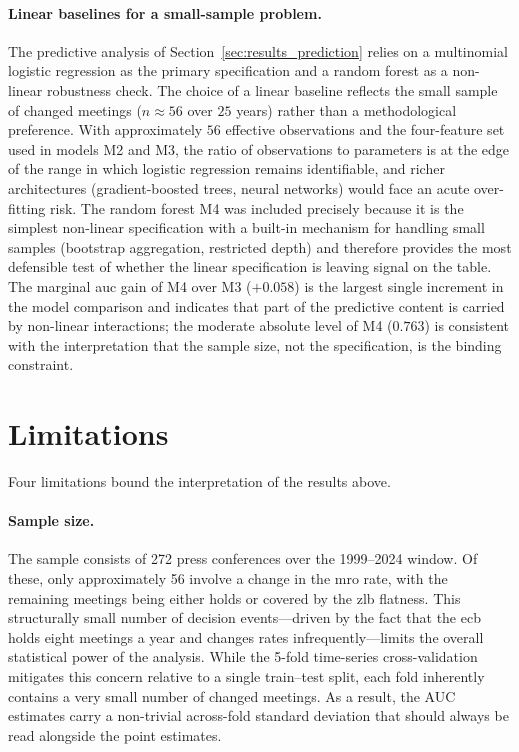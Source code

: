 \paragraph{Linear baselines for a small-sample problem.} The predictive analysis of Section~\ref{sec:results_prediction} relies on a multinomial logistic regression as the primary specification and a random forest as a non-linear robustness check. The choice of a linear baseline reflects the small sample of changed meetings ($n \approx 56$ over $25$ years) rather than a methodological preference. With approximately $56$ effective observations and the four-feature set used in models M2 and M3, the ratio of observations to parameters is at the edge of the range in which logistic regression remains identifiable, and richer architectures (gradient-boosted trees, neural networks) would face an acute over-fitting risk. The random forest M4 was included precisely because it is the simplest non-linear specification with a built-in mechanism for handling small samples (bootstrap aggregation, restricted depth) and therefore provides the most defensible test of whether the linear specification is leaving signal on the table. The marginal \gls{auc} gain of M4 over M3 ($+0.058$) is the largest single increment in the model comparison and indicates that part of the predictive content is carried by non-linear interactions; the moderate absolute level of M4 ($0.763$) is consistent with the interpretation that the sample size, not the specification, is the binding constraint.

\section{Limitations}
\label{sec:limitations}

Four limitations bound the interpretation of the results above.

\paragraph{Sample size.}
The sample consists of 272 press conferences over the 1999--2024 window. Of these, only approximately 56 involve a change in the \gls{mro} rate, with the remaining meetings being either holds or covered by the \gls{zlb} flatness. This structurally small number of decision events---driven by the fact that the \gls{ecb} holds eight meetings a year and changes rates infrequently---limits the overall statistical power of the analysis. While the 5-fold time-series cross-validation mitigates this concern relative to a single train--test split, each fold inherently contains a very small number of changed meetings. As a result, the AUC estimates carry a non-trivial across-fold standard deviation that should always be read alongside the point estimates.

